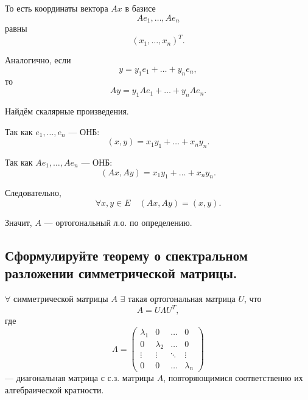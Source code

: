 \begin{Proof}
    То есть координаты вектора $Ax$ в базисе
    \[
        Ae_1,\ldots,Ae_n
    \]
    равны
    \[
        (x_1,\ldots,x_n)^T.
    \]

    Аналогично, если
    \[
        y=y_1e_1+\ldots+y_ne_n,
    \]
    то
    \[
        Ay=y_1Ae_1+\ldots+y_nAe_n.
    \]

    Найдём скалярные произведения.

    Так как $e_1,\ldots,e_n$ --- ОНБ:
    \[
        (x,y)=x_1y_1+\ldots+x_ny_n.
    \]

    Так как $Ae_1,\ldots,Ae_n$ --- ОНБ:
    \[
        (Ax,Ay)=x_1y_1+\ldots+x_ny_n.
    \]

    Следовательно,
    \[
        \forall x,y \in E\quad (Ax,Ay)=(x,y).
    \]

    Значит, $A$ --- ортогональный л.о. по определению.
\end{Proof}
\subsection{Сформулируйте теорему о спектральном разложении симметрической матрицы.}

\begin{theorem}
    $\forall$ симметрической матрицы $A$ $\exists$ такая ортогональная матрица $U$, что
    \[
        A = U\Lambda U^T,
    \]
    где
    \[
        \Lambda =
        \begin{pmatrix}
            \lambda_1 & 0 & \ldots & 0 \\
            0 & \lambda_2 & \ldots & 0 \\
            \vdots & \vdots & \ddots & \vdots \\
            0 & 0 & \ldots & \lambda_n
        \end{pmatrix}
    \]
    --- диагональная матрица с с.з. матрицы $A$, повторяющимися соответственно их алгебраической кратности.
\end{theorem}

